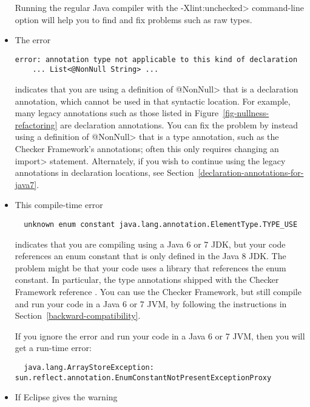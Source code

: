 \begin{itemize}
Running the regular Java compiler with the \<-Xlint:unchecked> command-line
option will help you to find and fix problems such as raw types.


\item
The error

\begin{Verbatim}
error: annotation type not applicable to this kind of declaration
    ... List<@NonNull String> ...
\end{Verbatim}

\noindent
indicates that you are using a definition of \<@NonNull> that is a
declaration annotation, which cannot be used in that syntactic location.
For example, many legacy annotations such as those listed in
Figure~\ref{fig-nullness-refactoring} are declaration annotations.  You can
fix the problem by instead using a definition of \<@NonNull> that is a type
annotation, such as the Checker Framework's annotations; often this only
requires changing an \<import> statement.
Alternately, if you wish to continue using the legacy annotations in
declaration locations, see Section~\ref{declaration-annotations-for-java7}.


\item
This compile-time error

\begin{Verbatim}
  unknown enum constant java.lang.annotation.ElementType.TYPE_USE
\end{Verbatim}

\noindent
indicates that you are compiling using a Java 6 or 7 JDK, but your code
references an enum constant that is only defined in the Java 8 JDK.  The
problem might be that your code uses a library that references the enum
constant.  In particular, the type annotations shipped with the Checker
Framework reference
.  You can use the Checker
Framework, but still compile and run your code in a Java 6 or 7 JVM, by
following the instructions in Section~\ref{backward-compatibility}.

If you ignore the error and run your code in a Java 6 or 7 JVM, then you will get a run-time error:

\begin{Verbatim}
  java.lang.ArrayStoreException: sun.reflect.annotation.EnumConstantNotPresentExceptionProxy
\end{Verbatim}


\item
If Eclipse gives the warning


\end{itemize}
